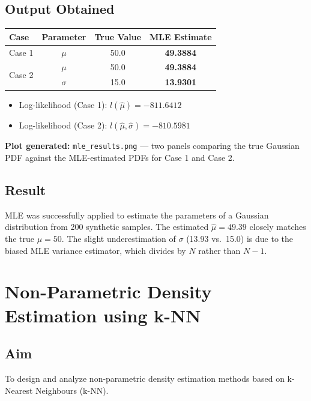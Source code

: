 \documentclass[12pt,a4paper]{article}
\begin{document}
\subsection*{Output Obtained}

\begin{center}
\begin{tabular}{lccc}
\toprule
\textbf{Case} & \textbf{Parameter} & \textbf{True Value} & \textbf{MLE Estimate} \\
\midrule
\multirow{1}{*}{Case 1} & $\mu$ & 50.0 & \textbf{49.3884} \\
\midrule
\multirow{2}{*}{Case 2} & $\mu$    & 50.0 & \textbf{49.3884} \\
                         & $\sigma$ & 15.0 & \textbf{13.9301} \\
\bottomrule
\end{tabular}
\end{center}

\begin{itemize}
  \item Log-likelihood (Case 1): $l(\hat{\mu}) = -811.6412$
  \item Log-likelihood (Case 2): $l(\hat{\mu}, \hat{\sigma}) = -810.5981$
\end{itemize}

\noindent \textbf{Plot generated:} \texttt{mle\_results.png} --- two panels comparing the true
Gaussian PDF against the MLE-estimated PDFs for Case 1 and Case 2.

\subsection*{Result}
MLE was successfully applied to estimate the parameters of a Gaussian distribution from 200
synthetic samples. The estimated $\hat{\mu} = 49.39$ closely matches the true $\mu = 50$.
The slight underestimation of $\sigma$ (13.93 vs.\ 15.0) is due to the biased MLE variance
estimator, which divides by $N$ rather than $N-1$.

\newpage

\section{Non-Parametric Density Estimation using k-NN}

\subsection*{Aim}
To design and analyze non-parametric density estimation methods based on
k-Nearest Neighbours (k-NN).
\end{document}
